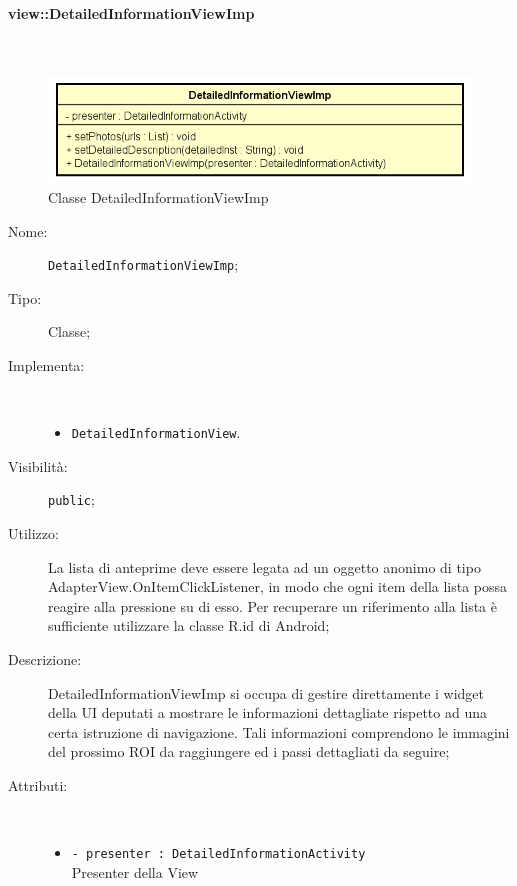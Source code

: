 \documentclass[../DefinizioneDiProdotto.tex]{subfiles}
\begin{document}
\paragraph{view::DetailedInformationViewImp}
\
\begin{figure}[H]
	\centering
	\includegraphics[width=\maxwidth]{img/DetailedInformationViewImp.png}
	\caption{Classe DetailedInformationViewImp}\label{fig:view::DetailedInformationViewImp} 
\end{figure}
\begin{description}
	\item[Nome:] \texttt{DetailedInformationViewImp};
	\item[Tipo:] Classe;
	\item[Implementa:] \
	\begin{itemize}
		\item \texttt{DetailedInformationView}.
		
	\end{itemize}
	\item[Visibilità:] \texttt{public};
	\item[Utilizzo:] La lista di anteprime deve essere legata ad un oggetto anonimo di tipo AdapterView.OnItemClickListener, in modo che ogni item della lista possa reagire alla pressione su di esso. Per recuperare un riferimento alla lista è sufficiente utilizzare la classe R.id di Android;
	\item[Descrizione:] DetailedInformationViewImp si occupa di gestire direttamente i widget della UI deputati a mostrare le informazioni dettagliate rispetto ad una certa istruzione di navigazione. Tali informazioni comprendono le immagini del prossimo ROI da raggiungere ed i passi dettagliati da seguire;
	\item[Attributi:] \
	\begin{itemize}
		\item \texttt{- presenter : DetailedInformationActivity}\\
		Presenter della View
		

\end{itemize}
\end{description}
\end{document}
